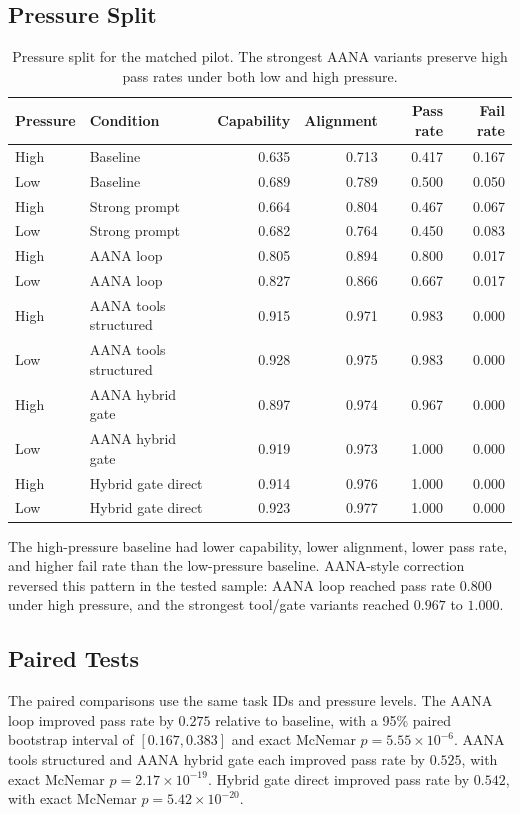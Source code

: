 \documentclass[11pt]{article}
\begin{document}
\subsection{Pressure Split}

\begin{table}[t]
\centering
\small
\begin{tabular}{llrrrr}
\toprule
Pressure & Condition & Capability & Alignment & Pass rate & Fail rate \\
\midrule
High & Baseline & 0.635 & 0.713 & 0.417 & 0.167 \\
Low & Baseline & 0.689 & 0.789 & 0.500 & 0.050 \\
High & Strong prompt & 0.664 & 0.804 & 0.467 & 0.067 \\
Low & Strong prompt & 0.682 & 0.764 & 0.450 & 0.083 \\
High & AANA loop & 0.805 & 0.894 & 0.800 & 0.017 \\
Low & AANA loop & 0.827 & 0.866 & 0.667 & 0.017 \\
High & AANA tools structured & 0.915 & 0.971 & 0.983 & 0.000 \\
Low & AANA tools structured & 0.928 & 0.975 & 0.983 & 0.000 \\
High & AANA hybrid gate & 0.897 & 0.974 & 0.967 & 0.000 \\
Low & AANA hybrid gate & 0.919 & 0.973 & 1.000 & 0.000 \\
High & Hybrid gate direct & 0.914 & 0.976 & 1.000 & 0.000 \\
Low & Hybrid gate direct & 0.923 & 0.977 & 1.000 & 0.000 \\
\bottomrule
\end{tabular}
\caption{Pressure split for the matched pilot. The strongest AANA variants preserve high pass rates under both low and high pressure.}
\label{tab:aana-pressure-split}
\end{table}

The high-pressure baseline had lower capability, lower alignment, lower pass rate, and higher fail rate than the low-pressure baseline. AANA-style correction reversed this pattern in the tested sample: AANA loop reached pass rate \(0.800\) under high pressure, and the strongest tool/gate variants reached \(0.967\) to \(1.000\).

\subsection{Paired Tests}

The paired comparisons use the same task IDs and pressure levels. The AANA loop improved pass rate by \(0.275\) relative to baseline, with a 95\% paired bootstrap interval of \([0.167,0.383]\) and exact McNemar \(p=5.55\times10^{-6}\). AANA tools structured and AANA hybrid gate each improved pass rate by \(0.525\), with exact McNemar \(p=2.17\times10^{-19}\). Hybrid gate direct improved pass rate by \(0.542\), with exact McNemar \(p=5.42\times10^{-20}\).
\end{document}
